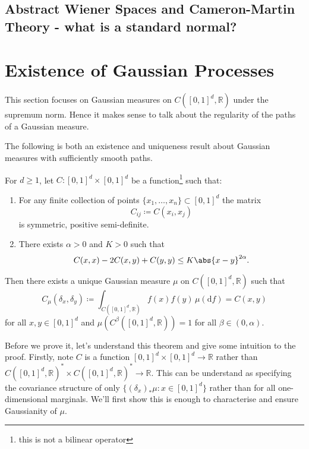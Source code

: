 \documentclass[fontsize=12pt, DIV=10]{scrreprt}
\theoremstyle{remark}
\newcommand{\defeq}{\coloneqq}
\newcommand{\R}{\mathbb R}
\newcommand{\dif}[1]{\text{d} #1}
\begin{document}
\subsection{Abstract Wiener Spaces and Cameron-Martin Theory - what is a standard normal?}

\section{Existence of Gaussian Processes}


This section focuses on Gaussian measures on $C([0,1]^d, \R)$ under the supremum norm. Hence it makes sense to talk about the regularity of the paths of a Gaussian measure.

The following is both an existence and uniqueness result about Gaussian measures with sufficiently smooth paths.
\begin{theorem}
	\label{thm:kcc}
	For $d \geq 1$, let $C: [0, 1]^d \times [0, 1]^d$ be a function\footnote{this is not a bilinear operator} such that:
	\begin{enumerate}
		\item For any finite collection of points $\{x_1, \ldots, x_n\} \subset [0, 1]^d$ the matrix
			\begin{equation}
				C_{ij} \defeq C(x_i, x_j)
			\end{equation}
			is symmetric, positive semi-definite.
		\item There exists $\alpha > 0$ and $K > 0$ such that
			\begin{equation}
				C(x, x) - 2C(x, y) + C(y, y) \leq K \abs{x - y}^{2 \alpha}.
			\end{equation}
	\end{enumerate}
	Then there exists a unique Gaussian measure $\mu$ on $C([0, 1]^d, \R)$ such that
	\begin{equation}
		C_{\mu}(\delta_x, \delta_y) \defeq \int_{C([0, 1]^d, \R)} f(x) f(y) \, \mu(\dif f) = C(x, y)
	\end{equation}
	for all $x, y \in [0, 1]^d$ and $\mu(C^{\beta}([0, 1]^d, \R)) = 1$ for all $\beta \in (0, \alpha)$.
\end{theorem}

Before we prove it, let's understand this theorem and give some intuition to the proof. Firstly, note $C$ is a function $[0,1]^d \times [0, 1]^d \to \R$ rather than $C([0,1]^d, \R)^* \times C([0, 1]^d, \R)^* \to \R$. This can be understand as specifying the covariance structure of only $\{(\delta_x)_* \mu : x \in [0, 1]^d\}$ rather than for all one-dimensional marginals. We'll first show this is enough to characterise and ensure Gaussianity of $\mu$.
\end{document}
